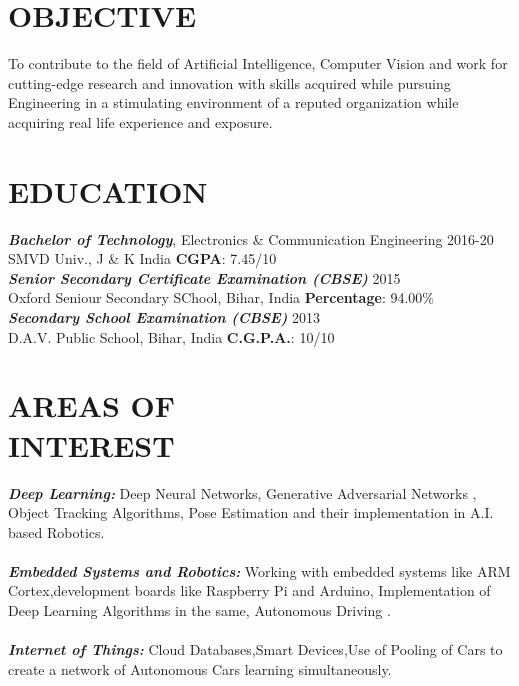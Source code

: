 \documentclass[margin]{res}
\begin{document}
\begin{resume}
\section{OBJECTIVE}  To contribute to the field of Artificial Intelligence, Computer Vision and work for cutting-edge research and innovation with skills acquired while pursuing Engineering in a stimulating environment of a reputed organization while acquiring real life experience and exposure.
 

\section{EDUCATION} {\sl \textbf{Bachelor of Technology}}, Electronics \& Communication Engineering \hfill 2016-20\\
                SMVD Univ., J \& K India \hfill \textbf{CGPA}: 7.45/10 \\
{\sl \textbf{Senior Secondary Certificate Examination (CBSE)}} \hfill 2015\\
                Oxford Seniour Secondary SChool, Bihar, India \hfill
                \textbf{Percentage}: 94.00\%\\
{\sl \textbf{Secondary School Examination (CBSE)}} \hfill 2013\\
                D.A.V. Public School, Bihar, India \hfill               \textbf{C.G.P.A.}: 10/10
          
 
 
\section{AREAS OF \\ INTEREST} {\sl \textbf{Deep Learning:}} Deep Neural Networks, Generative Adversarial Networks , Object Tracking Algorithms, Pose Estimation and  their implementation in  A.I. based Robotics.\\
\\
                {\sl \textbf{Embedded Systems and Robotics:}} Working with embedded systems like ARM Cortex,development boards like Raspberry Pi and Arduino, Implementation of Deep Learning Algorithms in the same, Autonomous Driving .\\
                \\
{\sl \textbf{Internet of Things:}} Cloud Databases,Smart Devices,Use of Pooling of Cars to create a network of Autonomous Cars learning simultaneously.





\end{resume}
\end{document}
